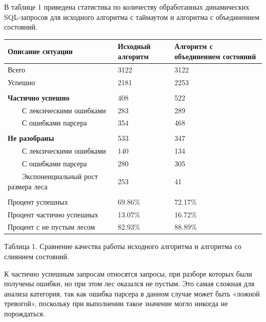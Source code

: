 \documentclass[a5paper]{article}
\begin{document}
В таблице 1 приведена статистика по количеству обработанных динамических SQL-запросов для исходного алгоритма с таймаутом и алгоритма с объединением состояний.
\begin{center}
\begin{tabular}[c c c]{| p{5cm} | p{2.5cm} | p{2.5cm} |}
\hline
Описание ситуации & Исходный алгоритм & Алгоритм с объединением состояний
\\
\hline
Всего & 3122 & 3122
\\
\hline
Успешно & 2181 & 2253
\\
\hline
 & &
\\
\hline
\bfseries{Частично успешно} & 408 & 522
\\
\hline

 \ \ \ \ С лексическими ошибками & 283 & 289
\\
\hline

 \ \ \ \ С ошибками парсера & 354 & 468
\\
\hline
 & &
\\
\hline

\bfseries{Не разобраны} & 533 & 347
\\
\hline
 \ \ \ \ С лексическими ошибками & 140 & 134
\\
\hline

 \ \ \ \ С ошибками парсера & 280 & 305
\\
\hline

 \ \ \ \ Экспоненциальный рост размера леса & 253 & 41

\\
\hline
 & &
\\
\hline


Процент успешных & 69.86\% & 72.17\%
\\
\hline

Процент частично успешных & 13.07\% & 16.72\%
\\
\hline

Процент с не пустым лесом & 82.93\% & 88.89\%
\\
\hline
 
\end{tabular}
\end{center}

Таблица 1. Сравнение качества работы исходного алгоритма и алгоритма со слиянием состояний.

К частично успешным запросам относятся запросы, при разборе которых были получены ошибки, но при этом лес оказался не пустым. Это самая сложная для анализа категория, так как ошибка парсера в данном случае может быть «ложной тревогой», поскольку при выполнении такое значение могло никогда не порождаться.
\end{document}
